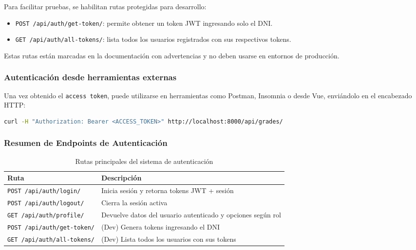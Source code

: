 \documentclass{article}
\begin{document}
Para facilitar pruebas, se habilitan rutas protegidas para desarrollo:

\begin{itemize}
  \item \texttt{POST /api/auth/get-token/}: permite obtener un token JWT ingresando solo el DNI.
  \item \texttt{GET /api/auth/all-tokens/}: lista todos los usuarios registrados con sus respectivos tokens.
\end{itemize}

Estas rutas están marcadas en la documentación con advertencias y no deben usarse en entornos de producción.

\subsubsection*{Autenticación desde herramientas externas}

Una vez obtenido el \texttt{access token}, puede utilizarse en herramientas como Postman, Insomnia o desde Vue, enviándolo en el encabezado HTTP:

\begin{lstlisting}[language=bash, caption={Ejemplo de uso con curl}]
curl -H "Authorization: Bearer <ACCESS_TOKEN>" http://localhost:8000/api/grades/
\end{lstlisting}

\subsubsection*{Resumen de Endpoints de Autenticación}

\begin{table}[H]
\centering
\begin{tabular}{|p{5cm}|p{9cm}|}
\hline
\rowcolor{tabledictionariesbackground!30}
\textbf{Ruta} & \textbf{Descripción} \\
\hline
\texttt{POST /api/auth/login/} & Inicia sesión y retorna tokens JWT + sesión \\
\texttt{POST /api/auth/logout/} & Cierra la sesión activa \\
\texttt{GET /api/auth/profile/} & Devuelve datos del usuario autenticado y opciones según rol \\
\texttt{POST /api/auth/get-token/} & (Dev) Genera tokens ingresando el DNI \\
\texttt{GET /api/auth/all-tokens/} & (Dev) Lista todos los usuarios con sus tokens \\
\hline
\end{tabular}
\caption{Rutas principales del sistema de autenticación}
\end{table}
\end{document}
